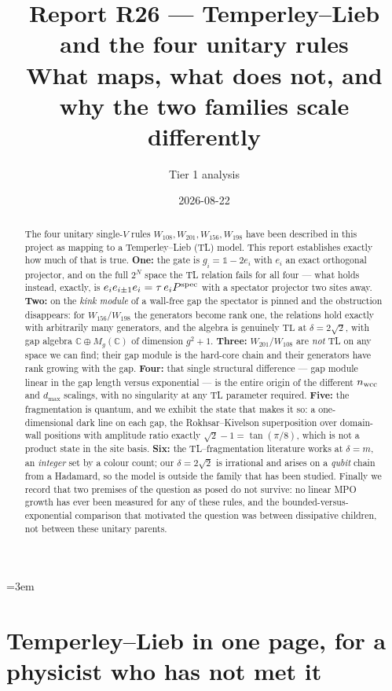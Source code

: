 \documentclass[11pt]{article}
\title{\textbf{Report R26 --- Temperley--Lieb and the four unitary rules}\\
\large What maps, what does not, and why the two families scale differently}
\author{Tier 1 analysis}
\date{2026-08-22}
\theoremstyle{plain}
\theoremstyle{remark}
\begin{document}
\maketitle
\sloppy
\emergencystretch=3em

\begin{abstract}
The four unitary single-$V$ rules $W_{108}, W_{201}, W_{156}, W_{198}$ have been
described in this project as mapping to a Temperley--Lieb (TL) model. This
report establishes exactly how much of that is true. \textbf{One:} the gate is
$g_i = \mathbb{1} - 2e_i$ with $e_i$ an exact orthogonal projector, and on the
full $2^N$ space the TL relation fails for all four --- what holds instead,
exactly, is $e_i e_{i\pm1} e_i = \tau\, e_i P^{\rm spec}$ with a spectator
projector two sites away. \textbf{Two:} on the \emph{kink module} of a wall-free
gap the spectator is pinned and the obstruction disappears: for $W_{156}/W_{198}$
the generators become rank one, the relations hold exactly with arbitrarily many
generators, and the algebra is genuinely $\mathrm{TL}$ at
$\delta = 2\sqrt2$, with gap algebra $\mathbb{C}\oplus M_g(\mathbb{C})$ of
dimension $g^2+1$. \textbf{Three:} $W_{201}/W_{108}$ are \emph{not} TL on any
space we can find; their gap module is the hard-core chain and their generators
have rank growing with the gap. \textbf{Four:} that single structural difference
--- gap module linear in the gap length versus exponential --- is the entire
origin of the different $n_{\rm wcc}$ and $d_{\max}$ scalings, with no
singularity at any TL parameter required. \textbf{Five:} the fragmentation is
quantum, and we exhibit the state that makes it so: a one-dimensional dark line
on each gap, the Rokhsar--Kivelson superposition over domain-wall positions with
amplitude ratio exactly $\sqrt2-1 = \tan(\pi/8)$, which is not a product state
in the site basis. \textbf{Six:} the TL--fragmentation literature works at
$\delta = m$, an \emph{integer} set by a colour count; our $\delta = 2\sqrt2$ is
irrational and arises on a \emph{qubit} chain from a Hadamard, so the model is
outside the family that has been studied. Finally we record that two premises of
the question as posed do not survive: no linear MPO growth has ever been
measured for any of these rules, and the bounded-versus-exponential comparison
that motivated the question was between dissipative children, not between these
unitary parents.
\end{abstract}

\tableofcontents

\section{Temperley--Lieb in one page, for a physicist who has not met it}
\label{sec:tl}
\end{document}
